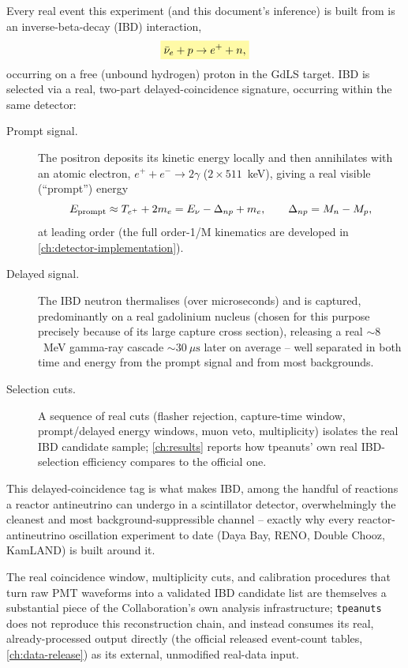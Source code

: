 \begin{theorybox}
Every real event this experiment (and this document's inference) is built
from is an inverse-beta-decay (IBD) interaction,
\begin{equation}
  \keyresult{\bar\nu_e + p \rightarrow e^+ + n,}
  \label{eq:intro-ibd-reaction}
\end{equation}
occurring on a free (unbound hydrogen) proton in the GdLS target. IBD is
selected via a real, two-part delayed-coincidence signature, occurring
within the same detector:
\begin{description}
  \item[Prompt signal.] The positron deposits its kinetic energy locally and
    then annihilates with an atomic electron, $e^+ + e^- \to 2\gamma$
    ($2\times 511$~keV), giving a real visible (``prompt'') energy
    \begin{equation}
      E_{\rm prompt} \approx T_{e^+} + 2 m_e = E_\nu - \Delta_{np} + m_e,
      \qquad \Delta_{np} = M_n - M_p,
    \end{equation}
    at leading order (the full order-1/M kinematics are developed in
    \cref{ch:detector-implementation}).
  \item[Delayed signal.] The IBD neutron thermalises (over microseconds)
    and is captured, predominantly on a real gadolinium nucleus
    (chosen for this purpose precisely because of its large capture cross
    section), releasing a real $\sim 8$~MeV gamma-ray cascade $\sim 30\
    \mu\mathrm{s}$ later on average -- well separated in both time and
    energy from the prompt signal and from most backgrounds.
  \item[Selection cuts.] A sequence of real cuts (flasher rejection,
    capture-time window, prompt/delayed energy windows, muon veto,
    multiplicity) isolates the real IBD candidate sample; \cref{ch:results}
    reports how tpeanuts' own real IBD-selection efficiency compares to the
    official one.
\end{description}
This delayed-coincidence tag is what makes IBD, among the handful of
reactions a reactor antineutrino can undergo in a scintillator detector,
overwhelmingly the cleanest and most background-suppressible channel --
exactly why every reactor-antineutrino oscillation experiment to date
(Daya Bay, RENO, Double Chooz, KamLAND) is built around it.
\end{theorybox}

\begin{notebox}
The real coincidence window, multiplicity cuts, and calibration procedures
that turn raw PMT waveforms into a validated IBD candidate list are
themselves a substantial piece of the Collaboration's own analysis
infrastructure; \texttt{tpeanuts} does not reproduce this reconstruction
chain, and instead consumes its real, already-processed output directly
(the official released event-count tables, \cref{ch:data-release}) as its
external, unmodified real-data input.
\end{notebox}

